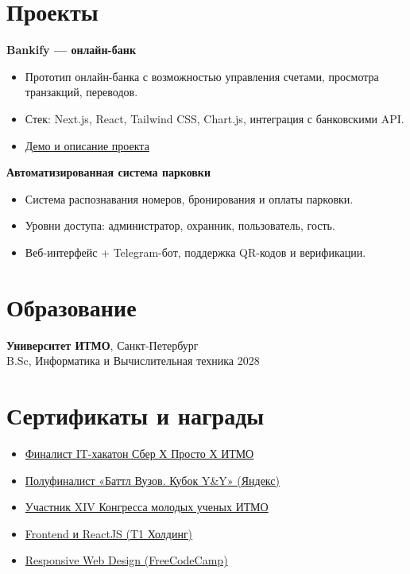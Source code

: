 \documentclass[a4paper,10pt]{article}
\begin{document}
\section*{Проекты}
\textbf{Bankify — онлайн-банк} \\
\begin{itemize}[left=0.5cm]
    \item Прототип онлайн-банка с возможностью управления счетами, просмотра транзакций, переводов.
    \item Стек: Next.js, React, Tailwind CSS, Chart.js, интеграция с банковскими API.
    \item \href{https://github.com/Jimike110/bankify}{Демо и описание проекта}
\end{itemize}

\noindent \textbf{Автоматизированная система парковки} \\
\begin{itemize}[left=0.5cm]
    \item Система распознавания номеров, бронирования и оплаты парковки.
    \item Уровни доступа: администратор, охранник, пользователь, гость.
    \item Веб-интерфейс + Telegram-бот, поддержка QR-кодов и верификации.
\end{itemize}

\section*{Образование}
\textbf{Университет ИТМО}, Санкт-Петербург \\
B.Sc, Информатика и Вычислительная техника \hfill 2028

\section*{Сертификаты и награды}
\begin{itemize}[left=0.5cm]
    \item \href{https://disk.yandex.ru/i/wE10Gv0LYPanjg}{Финалист IT-хакатон Сбер Х Просто Х ИТМО}
    \item \href{https://certify.s3.yandex.net/young-yandex/74b6021d-3100-422c-b4d4-0a0d8d1833ea/4df33b64-d63d-402a-92cb-dd5955e80ff3.pdf}{Полуфиналист «Баттл Вузов. Кубок Y\&Y» (Яндекс)}
    \item \href{https://disk.yandex.com/i/18mgstWwBD8qww}{Участник XIV Конгресса молодых ученых ИТМО}
    \item \href{https://davtb-teachbase.api.eric.s3storage.ru/system/coursestat/49661/cert/19d91e334cea39555bbbd7535c94fbca.pdf}{Frontend и ReactJS (T1 Холдинг)}
    \item \href{https://www.freecodecamp.org/certification/jimike/responsive-web-design}{Responsive Web Design (FreeCodeCamp)}
\end{itemize}
\end{document}
